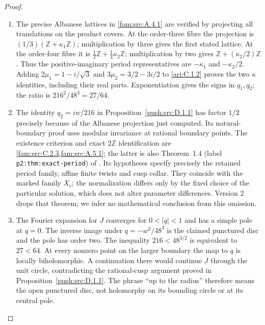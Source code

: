 \begin{proof}
\begin{enumerate}[label=\arabic*.,leftmargin=*]
\item The precise Albanese lattices in \cref{fam:src:A.4.1} are verified by projecting all
translations on the product covers. At the order-three fibre the
projection is $(1/3)(\mathbb Z+\kappa_1\mathbb Z)$; multiplication by
three gives the first stated lattice. At the order-four fibre it is
$\tfrac12\mathbb Z+\tfrac14\kappa_2\mathbb Z$; multiplication by two
gives $\mathbb Z+(\kappa_2/2)\mathbb Z$. Thus the positive-imaginary
period representatives are $-\kappa_1$ and $-\kappa_2/2$.
Adding $2\mu_1=1-i/\sqrt3$ and
$3\mu_2=3/2-3i/2$ to \ref{ari:C.1.2} proves the two $\kappa$ identities,
including their real parts. Exponentiation gives the signs in $q_1,q_2$;
the ratio is $216^2/48^3=27/64$.

\item The identity $q_2=iw/216$ in Proposition~\ref{push:src:D.1.1} has
factor $1/2$ precisely because of the Albanese projection just computed.
Its natural-boundary proof uses modular invariance at rational boundary
points. The existence criterion and exact $2\mathbb Z$
identification are \cref{fam:src:C.2.3,fam:src:A.5.1}; the latter is also Theorem~1.4
(label \texttt{p2:thm:exact-period}) of
\cite{DuGuoKusakabeXie2026v1}. Its hypotheses specify precisely the
retained period family, affine finite twists and cusp collar. They
coincide with the marked family $X_c$; the normalization differs
only by the fixed choice of the particular solution, which does not
alter parameter differences. Version 2 drops that theorem; we infer
no mathematical conclusion from this omission.

\item The Fourier expansion for $J$ converges for $0<|q|<1$ and has a simple
pole at $q=0$. The inverse image under $q=-w^2/48^3$ is the claimed
punctured disc and the pole has order two. The inequality
$216<48^{3/2}$ is equivalent to $27<64$. At every nonzero point on the
larger boundary the map to $q$ is locally biholomorphic. A continuation
there would continue $J$ through the unit circle, contradicting the
rational-cusp argument proved in Proposition~\ref{push:src:D.1.1}. The phrase ``up to the
radius'' therefore means the open punctured disc, not holomorphy on
its bounding circle or at its central pole.
\end{enumerate}
\end{proof}

